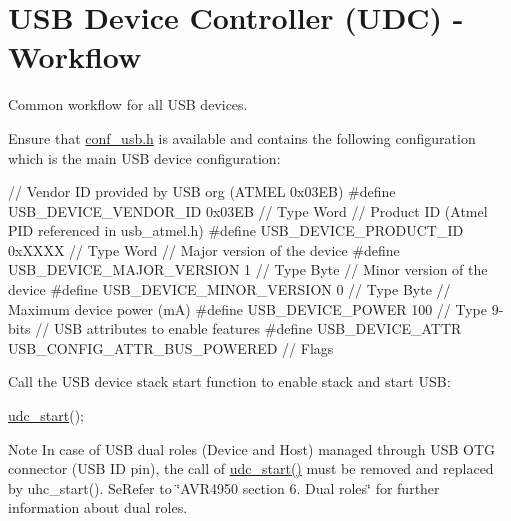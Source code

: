 \hypertarget{group__udc__basic__use__case__setup__flow}{\section{U\-S\-B Device Controller (U\-D\-C) -\/ Workflow}
\label{group__udc__basic__use__case__setup__flow}
}
Common workflow for all U\-S\-B devices.


\begin{DoxyEnumerate}
\item Ensure that \hyperlink{conf__usb_8h}{conf\-\_\-usb.\-h} is available and contains the following configuration which is the main U\-S\-B device configuration\-:
\begin{DoxyItemize}
\item 
\begin{DoxyCode}
 \textcolor{comment}{// Vendor ID provided by USB org (ATMEL 0x03EB)}
\textcolor{preprocessor}{        #define USB\_DEVICE\_VENDOR\_ID 0x03EB // Type Word}
\textcolor{preprocessor}{}        \textcolor{comment}{// Product ID (Atmel PID referenced in usb\_atmel.h)}
\textcolor{preprocessor}{        #define USB\_DEVICE\_PRODUCT\_ID 0xXXXX // Type Word}
\textcolor{preprocessor}{}        \textcolor{comment}{// Major version of the device}
\textcolor{preprocessor}{        #define USB\_DEVICE\_MAJOR\_VERSION 1 // Type Byte}
\textcolor{preprocessor}{}        \textcolor{comment}{// Minor version of the device}
\textcolor{preprocessor}{        #define USB\_DEVICE\_MINOR\_VERSION 0 // Type Byte}
\textcolor{preprocessor}{}        \textcolor{comment}{// Maximum device power (mA)}
\textcolor{preprocessor}{        #define USB\_DEVICE\_POWER 100 // Type 9-bits}
\textcolor{preprocessor}{}        \textcolor{comment}{// USB attributes to enable features}
\textcolor{preprocessor}{        #define USB\_DEVICE\_ATTR USB\_CONFIG\_ATTR\_BUS\_POWERED // Flags }
\end{DoxyCode}

\end{DoxyItemize}
\item Call the U\-S\-B device stack start function to enable stack and start U\-S\-B\-:
\begin{DoxyItemize}
\item 
\begin{DoxyCode}
 \hyperlink{group__udc__group__interne_gadf4e193509cd03ab6333d62629ea51e7}{udc\_start}(); 
\end{DoxyCode}
 \begin{DoxyNote}{Note}
In case of U\-S\-B dual roles (Device and Host) managed through U\-S\-B O\-T\-G connector (U\-S\-B I\-D pin), the call of \hyperlink{group__udc__group__interne_gadf4e193509cd03ab6333d62629ea51e7}{udc\-\_\-start()} must be removed and replaced by uhc\-\_\-start(). Se\-Refer to \char`\"{}\-A\-V\-R4950 section 6. Dual roles\char`\"{} for further information about dual roles. 
\end{DoxyNote}

\end{DoxyItemize}
\end{DoxyEnumerate}